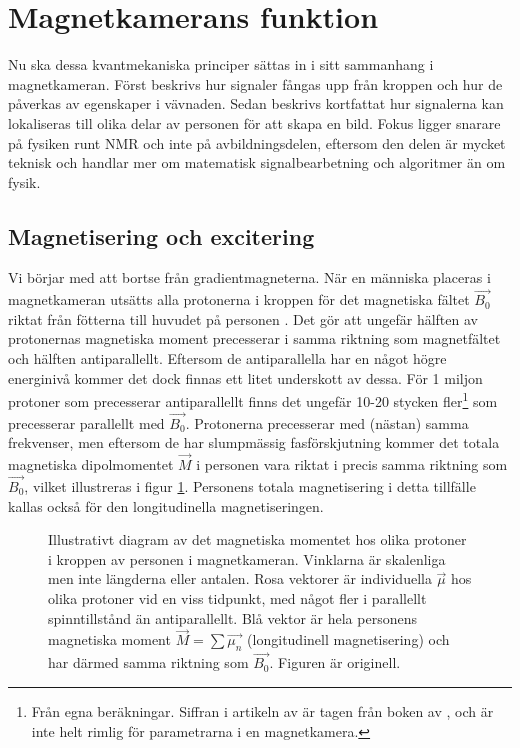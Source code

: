 \documentclass[11pt, a4paper]{article}
\begin{document}
\clearpage
\section{Magnetkamerans funktion}
Nu ska dessa kvantmekaniska principer sättas in i sitt sammanhang i magnetkameran. Först beskrivs hur signaler fångas upp från kroppen och hur de påverkas av egenskaper i vävnaden. Sedan beskrivs kortfattat hur signalerna kan lokaliseras till olika delar av personen för att skapa en bild. Fokus ligger snarare på fysiken runt NMR och inte på avbildningsdelen, eftersom den delen är mycket teknisk och handlar mer om matematisk signalbearbetning och algoritmer än om fysik.

\subsection{Magnetisering och excitering}
Vi börjar med att bortse från gradientmagneterna. När en människa placeras i magnetkameran utsätts alla protonerna i kroppen för det magnetiska fältet $\vec{B_0}$ riktat från fötterna till huvudet på personen \parencite{understanding_mri}. Det gör att ungefär hälften av protonernas magnetiska moment precesserar i samma riktning som magnetfältet och hälften antiparallellt. Eftersom de antiparallella har en något högre energinivå kommer det dock finnas ett litet underskott av dessa. För 1 miljon protoner som precesserar antiparallellt finns det ungefär 10-20 stycken fler\footnote{Från egna beräkningar. Siffran i artikeln av \textcite{understanding_mri} är tagen från boken  av \textcite{mri_made_easy}, och är inte helt rimlig för parametrarna i en magnetkamera.} som precesserar parallellt med $\vec{B_0}$. Protonerna precesserar med (nästan) samma frekvenser, men eftersom de har slumpmässig fasförskjutning kommer det totala magnetiska dipolmomentet $\vec{M}$ i personen vara riktat i precis samma riktning som $\vec{B_0}$, vilket illustreras i figur \ref{fig:spinn_vektorer}. Personens totala magnetisering i detta tillfälle kallas också för den longitudinella magnetiseringen.

\begin{figure}[ht]
	\centering
	
	\caption{Illustrativt diagram av det magnetiska momentet hos olika protoner i kroppen av personen i magnetkameran. Vinklarna är skalenliga men inte längderna eller antalen. Rosa vektorer är individuella $\vec{\mu}$ hos olika protoner vid en viss tidpunkt, med något fler i parallellt spinntillstånd än antiparallellt. Blå vektor är hela personens magnetiska moment $\vec{M}=\sum{\vec{\mu_n}}$ (longitudinell magnetisering) och har därmed samma riktning som $\vec{B_0}$. Figuren är originell.}
	\label{fig:spinn_vektorer}
\end{figure}
\end{document}
